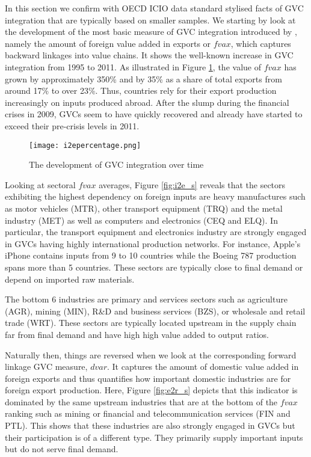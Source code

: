 \documentclass[11pt,a4paper]{article}
\begin{document}
In this section we confirm with OECD ICIO data standard stylised facts of GVC integration that are typically based on smaller samples. We starting by look at the development of the most basic measure of GVC integration introduced by \citet{dahuetal01}, namely the amount of foreign value added in exports or $fvax$, which captures backward linkages into value chains. It shows the well-known increase in GVC integration from 1995 to 2011. As illustrated in Figure \ref{fig:i2e_t}, the value of $fvax$ has grown by approximately 350\% and by 35\% as a share of total exports from around 17\% to over 23\%. Thus, countries rely for their export production increasingly on inputs produced abroad. After the slump during the financial crises in 2009, GVCs seem to have quickly recovered and already have started to exceed their pre-crisis levels in 2011.

\begin{figure}
\centering
\label{fig:i2e_t}
\texttt{[image: i2epercentage.png]}
\caption{The development of GVC integration over time}
\end{figure}

Looking at sectoral $fvax$ averages, Figure \ref{fig:i2e_s} reveals that the sectors exhibiting the highest dependency on foreign inputs are heavy manufactures such as motor vehicles (MTR), other transport equipment (TRQ) and the metal industry (MET) as well as computers and electronics (CEQ and ELQ). In particular, the transport equipment and electronics industry are strongly engaged in GVCs having highly international production networks. For instance, Apple's iPhone contains inputs from 9 to 10 countries while the Boeing 787 production spans more than 5 countries. These sectors are typically close to final demand or depend on imported raw materials.

The bottom 6 industries are primary and services sectors such as agriculture (AGR), mining (MIN), R\&D and business services (BZS), or wholesale and retail trade (WRT). These sectors are typically located upstream in the supply chain far from final demand and have high high value added to output ratios.

Naturally then, things are reversed when we look at the corresponding forward linkage GVC measure, $dvar$. It captures the amount of domestic value added in foreign exports and thus quantifies how important domestic industries are for foreign export production. Here, Figure \ref{fig:e2r_s} depicts that this indicator is dominated by the same upstream industries that are at the bottom of the $fvax$ ranking such as mining or financial and telecommunication services (FIN and PTL). This shows that these industries are also strongly engaged in GVCs but their participation is of a different type. They primarily supply important inputs but do not serve final demand. 
\end{document}
